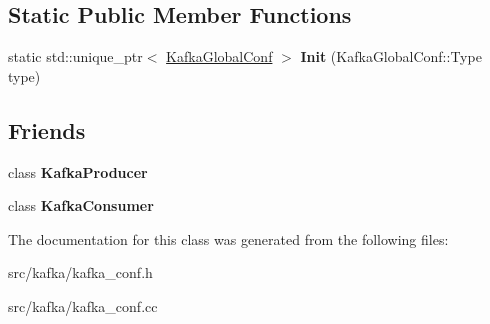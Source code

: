 \subsection*{Static Public Member Functions}
\begin{DoxyCompactItemize}
\item 
static std\+::unique\+\_\+ptr$<$ \hyperlink{classlog2hdfs_1_1KafkaGlobalConf}{Kafka\+Global\+Conf} $>$ {\bfseries Init} (Kafka\+Global\+Conf\+::\+Type type)\hypertarget{classlog2hdfs_1_1KafkaGlobalConf_a6c1386eb26a6d7046b747a0b51702335}{}\label{classlog2hdfs_1_1KafkaGlobalConf_a6c1386eb26a6d7046b747a0b51702335}

\end{DoxyCompactItemize}
\subsection*{Friends}
\begin{DoxyCompactItemize}
\item 
class {\bfseries Kafka\+Producer}\hypertarget{classlog2hdfs_1_1KafkaGlobalConf_a25501737c09078d7d152ac5ba415f843}{}\label{classlog2hdfs_1_1KafkaGlobalConf_a25501737c09078d7d152ac5ba415f843}

\item 
class {\bfseries Kafka\+Consumer}\hypertarget{classlog2hdfs_1_1KafkaGlobalConf_a6333789304ef25919eff3559a1e12c36}{}\label{classlog2hdfs_1_1KafkaGlobalConf_a6333789304ef25919eff3559a1e12c36}

\end{DoxyCompactItemize}


The documentation for this class was generated from the following files\+:\begin{DoxyCompactItemize}
\item 
src/kafka/kafka\+\_\+conf.\+h\item 
src/kafka/kafka\+\_\+conf.\+cc\end{DoxyCompactItemize}
